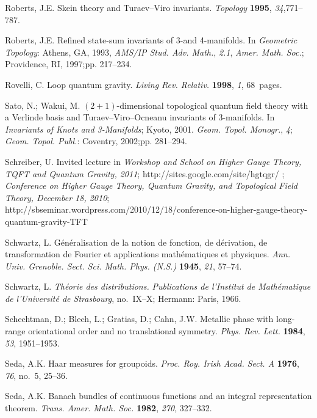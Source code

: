 \documentclass[12pt]{article}
\theoremstyle{plain}
\theoremstyle{definition}
\numberwithin{equation}{section}
\begin{document}
\begin{thebibliography}{199}
Roberts, J.E.  Skein theory and Turaev--Viro invariants. {\em Topology} {\bf 1995}, {\em 34},771--787.

Roberts, J.E. Refined state-sum invariants of 3-and 4-manifolds. In {\em Geometric Topology}: Athens, GA, 1993, {\em AMS/IP Stud. Adv. Math.}, {\em 2.1}, {\em Amer. Math. Soc.}; Providence, RI, 1997;pp. 217--234.

Rovelli, C. Loop quantum gravity. {\em Living Rev. Relativ.} {\bf 1998}, {\em 1}, 68~pages. 

Sato, N.; Wakui, M.  $(2 + 1)$-dimensional topological quantum field theory with a Verlinde basis and Turaev--Viro--Ocneanu invariants of 3-manifolds.  In {\em Invariants of Knots and 3-Manifolds}; Kyoto, 2001. {\em Geom. Topol. Monogr.}, {\em 4}; {\em Geom. Topol. Publ.}: Coventry, 2002;pp. 281--294.  %

Schreiber, U. Invited lecture in {\em Workshop and School on Higher Gauge Theory, TQFT and Quantum Gravity, 2011}; http://sites.google.com/site/hgtqgr/ ;  {\em Conference on Higher Gauge Theory, Quantum Gravity, and Topological Field Theory, December 18, 2010};\\
 http://sbseminar.wordpress.com/2010/12/18/conference-on-higher-gauge-theory-quantum-gravity-TFT

Schwartz, L. G\'en\'eralisation de la notion de fonction, de d\'erivation, de transformation de Fourier et applications math\'ematiques et physiques. {\em Ann. Univ. Grenoble. Sect. Sci. Math. Phys. (N.S.)} {\bf 1945}, {\em 21}, 57--74.

Schwartz, L. {\em Th\'eorie des distributions.} {\em Publications de l'Institut de Math\'ematique de l'Universit\'e de Strasbourg}, no.~IX--X; Hermann: Paris, 1966.

Schechtman, D.; Blech, L.; Gratias, D.; Cahn, J.W. Metallic phase with long-range orientational order and no translational symmetry. \emph{\em Phys. Rev. Lett.} {\bf 1984}, \emph{53}, 1951--1953.

Seda, A.K. Haar measures for groupoids. {\em Proc. Roy. Irish Acad. Sect. A} {\bf 1976}, {\em 76}, no.~5, 25--36.

Seda, A.K. Banach bundles of continuous functions and an integral representation theorem. {\em Trans. Amer. Math. Soc.} {\bf 1982}, {\em 270}, 327--332.


\end{thebibliography}
\end{document}
